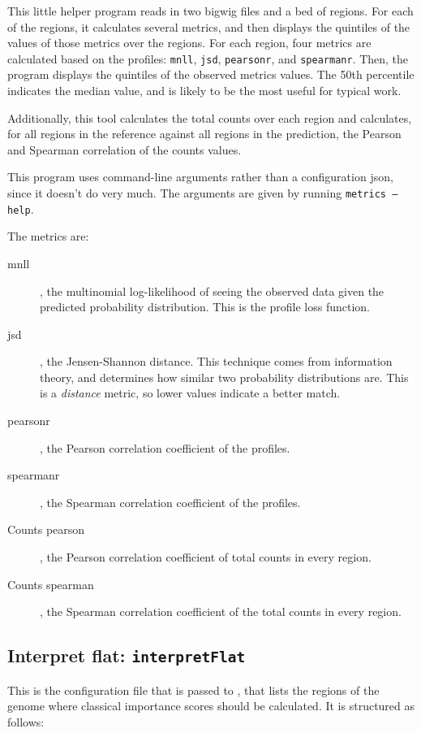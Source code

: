 \documentclass{article}
\begin{document}
This little helper program reads in two bigwig files and a bed of regions.
For each of the regions, it calculates several metrics, and then displays
the quintiles of the values of those metrics over the regions.
For each region, four metrics are calculated based on the profiles:
\texttt{mnll}, \texttt{jsd}, \texttt{pearsonr}, and \texttt{spearmanr}.
Then, the program displays the quintiles of the observed metrics values. The
50th percentile indicates the median value, and is likely to be the most useful
for typical work.

Additionally, this tool calculates the total counts over each region and
calculates, for all regions in the reference against all regions in the
prediction, the Pearson and Spearman correlation of the counts values.

This program uses command-line arguments rather than a configuration json,
since it doesn't do very much.
The arguments are given by running \texttt{metrics --help}.

The metrics are:
\begin{description}
    \item [mnll], the multinomial log-likelihood of seeing the observed data
        given the predicted probability distribution.
        This is the profile loss function.
    \item [jsd], the Jensen-Shannon distance.
        This technique comes from information theory, and determines how
        similar two probability distributions are.
        This is a \emph{distance} metric, so lower values indicate a better
        match.
    \item [pearsonr], the Pearson correlation coefficient of the profiles.
    \item [spearmanr], the Spearman correlation coefficient of the profiles.
    \item [Counts pearson], the Pearson correlation coefficient of total counts
        in every region.
    \item [Counts spearman], the Spearman correlation coefficient of the total
        counts in every region.
\end{description}


\newpage

\subsection{Interpret flat: \texttt{interpretFlat}}\label{prog:interpretFlat}

This is the configuration file that is passed to , that
lists the regions of the genome where classical importance scores should be
calculated.
It is structured as follows:
\end{document}
